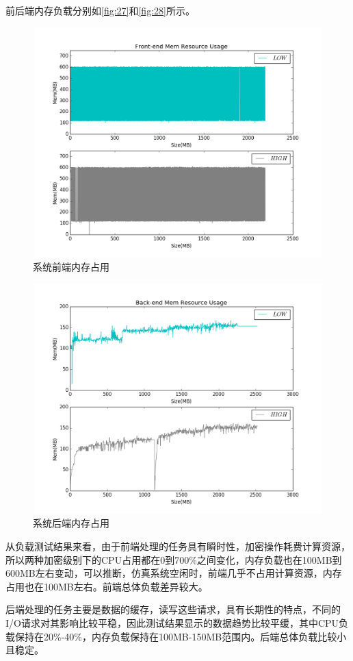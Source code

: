 前后端内存负载分别如\autoref{fig:27}和\autoref{fig:28}所示。
\begin{figure}[H]
	\centering
	\includegraphics[width=1\textwidth,height=3.5in]{Pics/figure_mem_client.png}
	\caption{系统前端内存占用}
	\label{fig:27}
\end{figure}
\begin{figure}[H]
	\centering
	\includegraphics[width=1\textwidth,height=3.5in]{Pics/figure_mem_server.png}
	\caption{系统后端内存占用}
	\label{fig:28}
\end{figure}
从负载测试结果来看，由于前端处理的任务具有瞬时性，加密操作耗费计算资源，所以两种加密级别下的CPU占用都在0到700\%之间变化，内存负载也在100MB到600MB左右变动，可以推断，仿真系统空闲时，前端几乎不占用计算资源，内存占用也在100MB左右。前端总体负载差异较大。


后端处理的任务主要是数据的缓存，读写这些请求，具有长期性的特点，不同的I/O请求对其影响比较平稳，因此测试结果显示的数据趋势比较平缓，其中CPU负载保持在20\%-40\%，内存负载保持在100MB-150MB范围内。后端总体负载比较小且稳定。
